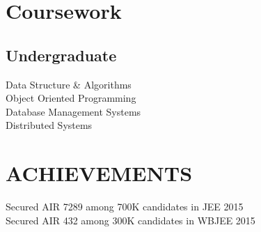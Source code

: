 \documentclass[]{plushcv}
\begin{document}
\begin{minipage}[t]{0.25\textwidth}



\section{Coursework}

\subsection{Undergraduate}

Data Structure \& Algorithms \textbullet{}\\
Object Oriented Programming \textbullet{}\\
Database Management Systems \textbullet{}\\
Distributed Systems \textbullet{}\\



\section{ACHIEVEMENTS} 
\sectionsep
Secured AIR 7289 among 700K candidates in JEE 2015\\
\sectionsep
\sectionsep
Secured AIR 432 among 300K candidates in WBJEE 2015\\
\sectionsep
\sectionsep


\end{minipage} 
\end{document}
